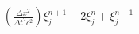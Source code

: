 \documentclass[preview]{standalone}
\begin{document}
\begin{align*}
(\frac{\Delta x^2}{\Delta t^2c^2}) \xi_{j}^{n+1} - 2 \xi_{j}^{n} + \xi_{j}^{n-1}
\end{align*}
\end{document}
